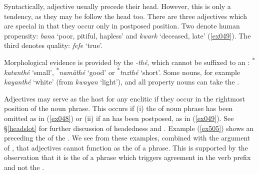 Syntactically, adjective usually precede their head. However, this is only a tendency, as they may be follow the head too. There are three adjectives which are special in that they occur only in postposed position. Two denote human propensity: \emph{bana} `poor, pitiful, hapless' and \emph{kwark} `deceased, late' (\ref{ex049}). The third denotes quality: \emph{fefe} `true'.

Morphological evidence is provided by the  \emph{-thé}, which cannot be suffixed to an : \textsuperscript{$\ast$}\emph{katanthé} `small', \textsuperscript{$\ast$}\emph{namäthé} `good' or \textsuperscript{$\ast$}\emph{tnzthé} `short'. Some nouns, for example \emph{kayanthé} `white' (from \emph{kwayan} `light'), and all property nouns can take the .

Adjectives may serve as the host for any  enclitic if they occur in the rightmost position of the noun phrase. This occurs if (i) the  of noun phrase has been omitted as in (\ref{ex048}) or (ii) if an  has been postposed, as in (\ref{ex049}). See {\S}\ref{headslot} for further discussion of headedness and . Example (\ref{ex505}) shows an  preceding the  of the . We see from these examples, combined with the argument of , that adjectives cannot function as the  of a phrase. This is supported by the observation that it is the  of a phrase which triggers agreement in the verb prefix and not the .

